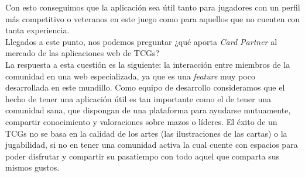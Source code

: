 \documentclass[10pt]{article}
\begin{document}
	Con esto conseguimos que la aplicación sea útil tanto para jugadores con un perfil más competitivo o veteranos en este juego como para aquellos que no cuenten con tanta experiencia.\\
	
	Llegados a este punto, nos podemos preguntar ¿qué aporta \textit{Card Partner} al mercado de las aplicaciones web de TCGs? \\
	
	La respuesta a esta cuestión es la siguiente: la interacción entre miembros de la comunidad en una web especializada, ya que es una \textit{feature} muy poco desarrollada en este mundillo. Como equipo de desarrollo consideramos que el hecho de tener una aplicación útil es tan importante como el de tener una comunidad sana, que dispongan de una plataforma para ayudarse mutuamente, compartir conocimiento y valoraciones sobre mazos o líderes. El éxito de un TCGs no se basa en la calidad de los artes (las ilustraciones de las cartas) o la jugabilidad, si no en tener una comunidad activa la cual cuente con espacios para poder disfrutar y compartir su pasatiempo con todo aquel que comparta sus mismos gustos.\\
	
	
\newpage
\end{document}
